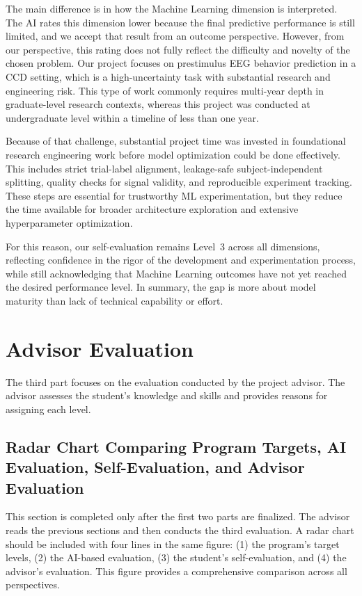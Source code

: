 The main difference is in how the Machine Learning dimension is interpreted. The AI rates this
dimension lower because the final predictive performance is still limited, and we accept that
result from an outcome perspective. However, from our perspective, this rating does not fully
reflect the difficulty and novelty of the chosen problem. Our project focuses on prestimulus EEG
behavior prediction in a CCD setting, which is a high-uncertainty task with substantial research
and engineering risk. This type of work commonly requires multi-year depth in graduate-level
research contexts, whereas this project was conducted at undergraduate level within a timeline
of less than one year.

Because of that challenge, substantial project time was invested in foundational research
engineering work before model optimization could be done effectively. This includes strict
trial-label alignment, leakage-safe subject-independent splitting, quality checks for signal
validity, and reproducible experiment tracking. These steps are essential for trustworthy
ML experimentation, but they reduce the time available for broader architecture exploration
and extensive hyperparameter optimization.

For this reason, our self-evaluation remains Level~3 across all dimensions, reflecting confidence
in the rigor of the development and experimentation process, while still acknowledging that
Machine Learning outcomes have not yet reached the desired performance level. In summary,
the gap is more about model maturity than lack of technical capability or effort.

\section{Advisor Evaluation}
\label{sec:advisor-evaluation}

The third part focuses on the evaluation conducted by the project advisor. The advisor assesses
the student's knowledge and skills and provides reasons for assigning each level.

\subsection{Radar Chart Comparing Program Targets, AI Evaluation, Self-Evaluation, and Advisor Evaluation}
\label{subsec:radar-advisor}

This section is completed only after the first two parts are finalized. The advisor reads the
previous sections and then conducts the third evaluation. A radar chart should be included with
four lines in the same figure: (1) the program's target levels, (2) the AI-based evaluation,
(3) the student's self-evaluation, and (4) the advisor's evaluation. This figure provides a
comprehensive comparison across all perspectives.

